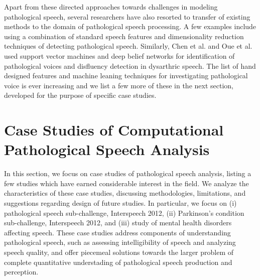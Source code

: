 \documentclass{article}
\begin{document}
Apart from these directed approaches towards challenges in modeling pathological speech, several researchers have also resorted to transfer of existing methods to the domain of pathological speech processing.
A few examples \cite{godino2006dimensionality,umapathy2005feature} include using a combination of standard speech features and dimensionality reduction techniques of detecting pathological speech.
Similarly, Chen et al. \cite{chen2007svm} and Oue et al. \cite{oueautomatic} used support vector machines and deep belief networks for identification of pathological voices and disfluency detection in dysarthric speech.
The list of hand designed features and machine leaning techniques for investigating pathological voice is ever increasing and we list a few more of these in the next section, developed for the purpose of specific case studies.

\section{Case Studies of Computational Pathological Speech Analysis}
In this section, we focus on case studies of pathological speech analysis, listing a few studies which have earned considerable interest in the field. We analyze the characteristics of these case studies, discussing methodologies, limitations, and suggestions regarding design of future studies.
In particular, we focus on (i) pathological speech sub-challenge, Interspeech 2012, (ii) Parkinson's condition sub-challenge, Interspeech 2012, and (iii) study of mental health disorders affecting speech. 
These case studies address components of understanding pathological speech, such as assessing intelligibility of speech and analyzing speech quality, and offer piecemeal solutions towards the larger problem of complete quantitative understading of pathological speech production and perception.
\end{document}
